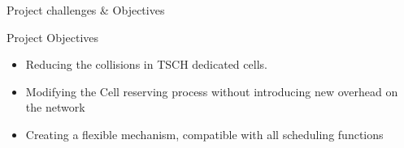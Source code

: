 \begin{withoutheadline}
\begin{frame}{Project challenges \& Objectives}
\begin{minipage}[t]{0.48\linewidth}
\begin{figure}[p]
  
\end{figure}
\end{minipage}

\end{frame}
\end{withoutheadline}


\begin{withoutheadline}
\begin{frame}{Project Objectives}
\begin{itemize}
\item {Reducing the collisions in TSCH dedicated cells.}
  \item<2-> {Modifying the Cell reserving process without introducing new overhead on the network}
  \item<3-> {Creating a flexible mechanism, compatible with all scheduling functions }

\end{itemize}

\end{frame}
\end{withoutheadline}
